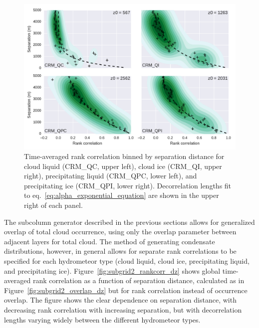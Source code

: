 \begin{figure}[htbp]
\centering
\includegraphics{graphics/subgrid2_rankcorr_dz.pdf}
\caption{\label{fig:subgrid2_rankcorr_dz}Time-averaged rank correlation
binned by separation distance for cloud liquid (CRM\_QC, upper left),
cloud ice (CRM\_QI, upper right), precipitating liquid (CRM\_QPC, lower
left), and precipitating ice (CRM\_QPI, lower right). Decorrelation
lengths fit to eq.~\ref{eq:alpha_exponential_equation} are shown in the
upper right of each panel.}\label{fig:subgrid2ux5frankcorrux5fdz}
\end{figure}

The subcolumn generator described in the previous sections allows for
generalized overlap of total cloud occurrence, using only the overlap
parameter between adjacent layers for total cloud. The method of
generating condensate distributions, however, in general allows for
separate rank correlations to be specified for each hydrometeor type
(cloud liquid, cloud ice, precipitating liquid, and precipitating ice).
Figure~\ref{fig:subgrid2_rankcorr_dz} shows global time-averaged rank
correlation as a function of separation distance, calculated as in
Figure~\ref{fig:subgrid2_overlap_dz} but for rank correlation instead of
occurrence overlap. The figure shows the clear dependence on separation
distance, with decreasing rank correlation with increasing separation,
but with decorrelation lengths varying widely between the different
hydrometeor types.

